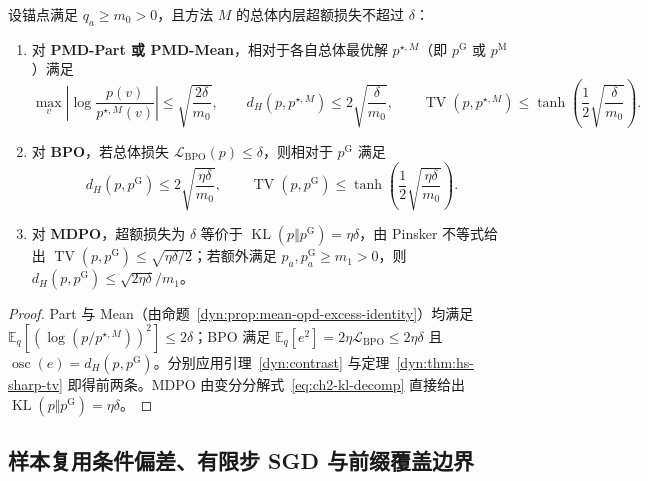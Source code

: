 \documentclass[lang=cn,scheme=chinese,openany]{elegantbook}
\newcommand{\E}{\mathbb E}
\newcommand{\KL}{\operatorname{KL}}
\newcommand{\TV}{\operatorname{TV}}
\begin{document}
\begin{proposition}[四种内层方法的总体超额损失到输出距离接口]
\label{dyn:regression-gap}
\label{dyn:mdpo-gap}
设锚点满足 $q_a\ge m_0>0$，且方法 $M$ 的总体内层超额损失不超过 $\delta$：
\begin{enumerate}
\item 对 \textbf{PMD-Part 或 PMD-Mean}，相对于各自总体最优解 $p^{\star,M}$（即 $p^{\mathrm G}$ 或 $p^{\mathrm M}$）满足
\begin{equation}
\max_v\left|\log\frac{p(v)}{p^{\star,M}(v)}\right|\le\sqrt{\frac{2\delta}{m_0}},\qquad
d_H(p,p^{\star,M})\le 2\sqrt{\frac{\delta}{m_0}},\qquad
\TV(p,p^{\star,M})\le\tanh\!\left(\frac12\sqrt{\frac{\delta}{m_0}}\right).
\end{equation}
\item 对 \textbf{BPO}，若总体损失 $\mathcal L_{\mathrm{BPO}}(p)\le\delta$，则相对于 $p^{\mathrm G}$ 满足
\begin{equation}
d_H(p,p^{\mathrm G})\le 2\sqrt{\frac{\eta\delta}{m_0}},\qquad
\TV(p,p^{\mathrm G})\le\tanh\!\left(\frac12\sqrt{\frac{\eta\delta}{m_0}}\right).
\end{equation}
\item 对 \textbf{MDPO}，超额损失为 $\delta$ 等价于 $\KL(p\Vert p^{\mathrm G})=\eta\delta$，由 Pinsker 不等式给出 $\TV(p,p^{\mathrm G})\le\sqrt{\eta\delta/2}$；若额外满足 $p_a,p_a^{\mathrm G}\ge m_1>0$，则 $d_H(p,p^{\mathrm G})\le\sqrt{2\eta\delta}/m_1$。
\end{enumerate}
\end{proposition}
\begin{proof}
Part 与 Mean（由命题~\ref{dyn:prop:mean-opd-excess-identity}）均满足 $\E_q[(\log(p/p^{\star,M}))^2]\le 2\delta$；BPO 满足 $\E_q[e^2]=2\eta\mathcal L_{\mathrm{BPO}}\le 2\eta\delta$ 且 $\operatorname{osc}(e)=d_H(p,p^{\mathrm G})$。分别应用引理~\ref{dyn:contrast} 与定理~\ref{dyn:thm:hs-sharp-tv} 即得前两条。MDPO 由变分分解式~\eqref{eq:ch2-kl-decomp} 直接给出 $\KL(p\Vert p^{\mathrm G})=\eta\delta$。
\end{proof}

\subsection{样本复用条件偏差、有限步 SGD 与前缀覆盖边界}
\label{dyn:replay}
\label{dyn:coverage-gap}
\end{document}
